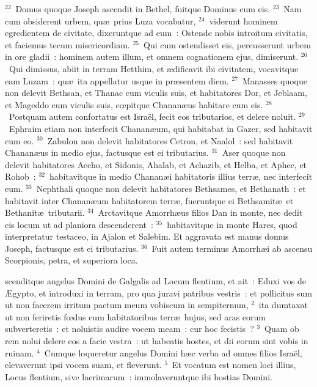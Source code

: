 ${}^{22}$~Domus quoque Joseph ascendit in Bethel, fuitque Dominus cum eis.
${}^{23}$~Nam cum obsiderent urbem, qu\ae\ prius Luza vocabatur,
${}^{24}$~viderunt hominem egredientem de civitate, dixeruntque ad eum~: Ostende nobis introitum civitatis, et faciemus tecum misericordiam.
${}^{25}$~Qui cum ostendisset eis, percusserunt urbem in ore gladii~: hominem autem illum, et omnem cognationem ejus, dimiserunt.
${}^{26}$~Qui dimissus, abiit in terram Hetthim, et \ae dificavit ibi civitatem, vocavitque eam Luzam~: qu\ae\ ita appellatur usque in pr\ae sentem diem.
${}^{27}$~Manasses quoque non delevit Bethsan, et Thanac cum viculis suis, et habitatores Dor, et Jeblaam, et Mageddo cum viculis suis, cœpitque Chanan\ae us habitare cum eis.
${}^{28}$~Postquam autem confortatus est Isra\"el, fecit eos tributarios, et delere noluit.
${}^{29}$~Ephraim etiam non interfecit Chanan\ae um, qui habitabat in Gazer, sed habitavit cum eo.
${}^{30}$~Zabulon non delevit habitatores Cetron, et Naalol~: sed habitavit Chanan\ae us in medio ejus, factusque est ei tributarius.
${}^{31}$~Aser quoque non delevit habitatores Accho, et Sidonis, Ahalab, et Achazib, et Helba, et Aphec, et Rohob~:
${}^{32}$~habitavitque in medio Chanan\ae i habitatoris illius terr\ae , nec interfecit eum.
${}^{33}$~Nephthali quoque non delevit habitatores Bethsames, et Bethanath~: et habitavit inter Chanan\ae um habitatorem terr\ae , fueruntque ei Bethsamit\ae\ et Bethanit\ae\ tributarii.
${}^{34}$~Arctavitque Amorrh\ae us filios Dan in monte, nec dedit eis locum ut ad planiora descenderent~:
${}^{35}$~habitavitque in monte Hares, quod interpretatur testaceo, in Ajalon et Salebim. Et aggravata est manus domus Joseph, factusque est ei tributarius.
${}^{36}$~Fuit autem terminus Amorrh\ae i ab ascensu Scorpionis, petra, et superiora loca.

\bchapter
{}scenditque angelus Domini de Galgalis ad Locum flentium, et ait~: Eduxi vos de \AE gypto, et introduxi in terram, pro qua juravi patribus vestris~: et pollicitus sum ut non facerem irritum pactum meum vobiscum in sempiternum,
${}^{2}$~ita dumtaxat ut non feriretis fœdus cum habitatoribus terr\ae\ hujus, sed aras eorum subverteretis~: et noluistis audire vocem meam~: cur hoc fecistis~?
${}^{3}$~Quam ob rem nolui delere eos a facie vestra~: ut habeatis hostes, et dii eorum sint vobis in ruinam.
${}^{4}$~Cumque loqueretur angelus Domini h\ae c verba ad omnes filios Isra\"el, elevaverunt ipsi vocem suam, et fleverunt.
${}^{5}$~Et vocatum est nomen loci illius, Locus flentium, sive lacrimarum~: immolaveruntque ibi hostias Domini.


